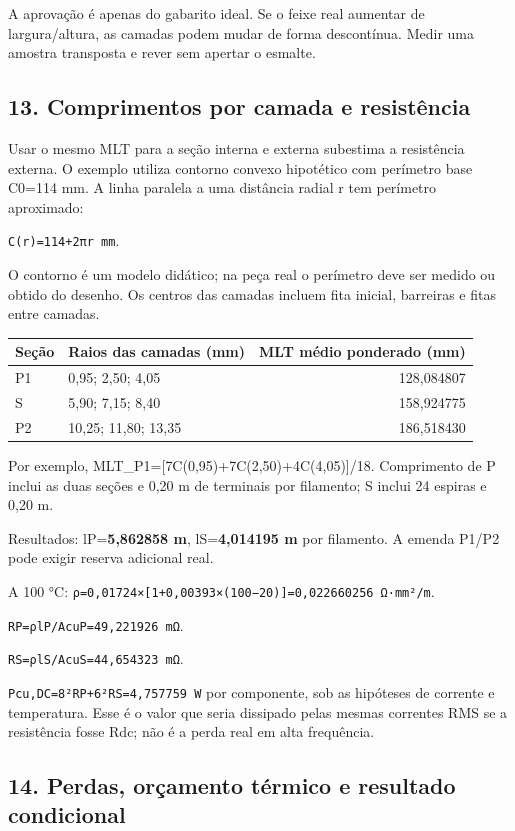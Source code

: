 \documentclass[
]{article}
\begin{document}
A aprovação é apenas do gabarito ideal. Se o feixe real aumentar de
largura/altura, as camadas podem mudar de forma descontínua. Medir uma
amostra transposta e rever sem apertar o esmalte.

\subsection{13. Comprimentos por camada e
resistência}\label{comprimentos-por-camada-e-resistuxeancia}

Usar o mesmo MLT para a seção interna e externa subestima a resistência
externa. O exemplo utiliza contorno convexo hipotético com perímetro
base C0=114 mm. A linha paralela a uma distância radial r tem perímetro
aproximado:

\texttt{C(r)=114+2πr\ mm}.

O contorno é um modelo didático; na peça real o perímetro deve ser
medido ou obtido do desenho. Os centros das camadas incluem fita
inicial, barreiras e fitas entre camadas.

\begin{longtable}[]{@{}llr@{}}
\toprule\noalign{}
Seção & Raios das camadas (mm) & MLT médio ponderado (mm) \\
\midrule\noalign{}
\endhead
\bottomrule\noalign{}
\endlastfoot
P1 & 0,95; 2,50; 4,05 & 128,084807 \\
S & 5,90; 7,15; 8,40 & 158,924775 \\
P2 & 10,25; 11,80; 13,35 & 186,518430 \\
\end{longtable}

Por exemplo, MLT\_P1={[}7C(0,95)+7C(2,50)+4C(4,05){]}/18. Comprimento de
P inclui as duas seções e 0,20 m de terminais por filamento; S inclui 24
espiras e 0,20 m.

Resultados: lP=\textbf{5,862858 m}, lS=\textbf{4,014195 m} por
filamento. A emenda P1/P2 pode exigir reserva adicional real.

A 100 °C:
\texttt{ρ=0,01724×{[}1+0,00393×(100−20){]}=0,022660256\ Ω·mm²/m}.

\texttt{RP=ρlP/AcuP=49,221926\ mΩ}.

\texttt{RS=ρlS/AcuS=44,654323\ mΩ}.

\texttt{Pcu,DC=8²RP+6²RS=4,757759\ W} por componente, sob as hipóteses
de corrente e temperatura. Esse é o valor que seria dissipado pelas
mesmas correntes RMS se a resistência fosse Rdc; não é a perda real em
alta frequência.

\subsection{14. Perdas, orçamento térmico e resultado
condicional}\label{perdas-oruxe7amento-tuxe9rmico-e-resultado-condicional}
\end{document}
